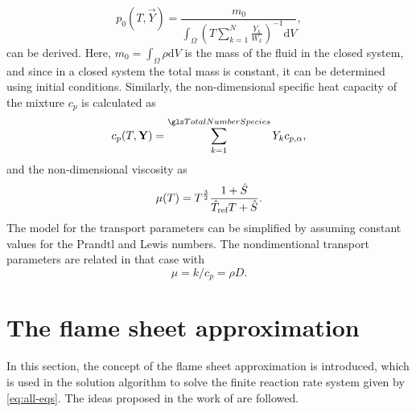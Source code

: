 \begin{equation}
	p_0(T, \vec{Y}) = \frac{m_0}{\int_\Omega \left( T\sum_{k=1}^{N} \frac{Y_k}{W_k} \right)^{-1}\text{d}V}, \label{eq:p0Condition}
\end{equation}
can be derived. Here, $m_0 = \int_\Omega \rho \text{d}V$ is the mass of the fluid in the closed system, and since in a closed system the total mass is constant, it can be determined using initial conditions.
Similarly, the non-dimensional specific heat capacity of the mixture $c_p$ is calculated as
\begin{equation}\label{eq:nondim_cpmixture}
	c_p(T,\mathbf{Y}) = \SumOvAllns Y_k c_{p,\alpha},
\end{equation}
and the non-dimensional viscosity as
\begin{equation} \label{eq:nondim_sutherland}
	\mu(T) =  T^{\frac{3}{2}}\frac{1+\hat{S} }{\hat T_{\text{ref}}T+\hat{S}}.
\end{equation}
The model for the transport parameters can be simplified by assuming constant values for the Prandtl and Lewis numbers. \citep{smokeFormulationPremixedNonpremixed1991}  The nondimentional transport parameters are related in that case with 
\begin{equation}
    \mu = k/c_p = \rho D.
\end{equation}
\section{The flame sheet approximation} \label{sec:FlameSheet}
In this section, the concept of the flame sheet approximation is introduced, which is used in the solution algorithm to solve the finite reaction rate system given by \cref{eq:all-eqs}. The ideas proposed in the work of \cite{keyesFlameSheetStarting1987} are followed.

